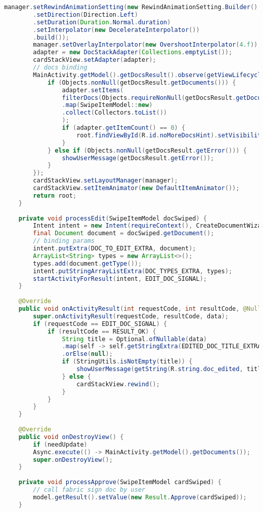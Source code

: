\begin{lstlisting}[language=Java]
		manager.setRewindAnimationSetting(new RewindAnimationSetting.Builder()
		.setDirection(Direction.Left)
		.setDuration(Duration.Normal.duration)
		.setInterpolator(new DecelerateInterpolator())
		.build());
		manager.setOverlayInterpolator(new OvershootInterpolator(4.f));
		adapter = new DocStackAdapter(Collections.emptyList());
		cardStackView.setAdapter(adapter);
		// docs binding
		MainActivity.getModel().getDocsResult().observe(getViewLifecycleOwner(), getDocsResult -> {
			if (Objects.nonNull(getDocsResult.getDocuments())) {
				adapter.setItems(
				filterDocs(Objects.requireNonNull(getDocsResult.getDocuments())).stream()
				.map(SwipeItemModel::new)
				.collect(Collectors.toList())
				);
				if (adapter.getItemCount() == 0) {
					root.findViewById(R.id.noMoreDocsHint).setVisibility(View.VISIBLE);
				}
			} else if (Objects.nonNull(getDocsResult.getError())) {
				showUserMessage(getDocsResult.getError());
			}
		});
		cardStackView.setLayoutManager(manager);
		cardStackView.setItemAnimator(new DefaultItemAnimator());
		return root;
	}
	
	private void processEdit(SwipeItemModel docSwiped) {
		Intent intent = new Intent(requireContext(), CreateDocumentWizardActivity.class);
		final Document document = docSwiped.getDocument();
		// binding params
		intent.putExtra(DOC_TO_EDIT_EXTRA, document);
		ArrayList<String> types = new ArrayList<>();
		types.add(document.getType());
		intent.putStringArrayListExtra(DOC_TYPES_EXTRA, types);
		startActivityForResult(intent, EDIT_DOC_SIGNAL);
	}
	
	@Override
	public void onActivityResult(int requestCode, int resultCode, @Nullable Intent data) {
		super.onActivityResult(requestCode, resultCode, data);
		if (requestCode == EDIT_DOC_SIGNAL) {
			if (resultCode == RESULT_OK) {
				String title = Optional.ofNullable(data)
				.map(self -> self.getStringExtra(EDITED_DOC_TITLE_EXTRA))
				.orElse(null);
				if (StringUtils.isNotEmpty(title)) {
					showUserMessage(getString(R.string.doc_edited, title));
				} else {
					cardStackView.rewind();
				}
			}
		}
	}
	
	@Override
	public void onDestroyView() {
		if (needUpdate)
		Async.execute(() -> MainActivity.getModel().getDocuments());
		super.onDestroyView();
	}
	
	private void processApprove(SwipeItemModel cardSwiped) {
		// call fabric sign doc by user
		model.getResult().setValue(new Result.Approve(cardSwiped));
	}
	

\end{lstlisting}
